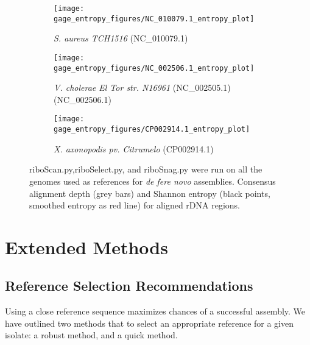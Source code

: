 \documentclass[10pt]{article}
\begin{document}
\begin{figure}
  \centering
  \ContinuedFloat
  \begin{subfigure}[b]{.45\textwidth}
    \texttt{[image: gage\_entropy\_figures/NC\_010079.1\_entropy\_plot]}
    \caption{\textit{S. aureus TCH1516} (NC\_010079.1)}
    \label{fig:ent_tch}
  \end{subfigure}
  \begin{subfigure}[b]{.45\textwidth}
    \texttt{[image: gage\_entropy\_figures/NC\_002506.1\_entropy\_plot]}
    \caption{\textit{V. cholerae El Tor str. N16961} (NC\_002505.1) (NC\_002506.1)}
    \label{fig:ent_vib}
  \end{subfigure}
  \begin{subfigure}[b]{.45\textwidth}
    \texttt{[image: gage\_entropy\_figures/CP002914.1\_entropy\_plot]}
    \caption{\textit{X. axonopodis pv. Citrumelo} (CP002914.1)}
  \end{subfigure}
  \caption{riboScan.py,riboSelect.py, and riboSnag.py were run on all the genomes used as references for \textit{de fere novo} assemblies. Consensus alignment depth (grey bars) and Shannon entropy (black points, smoothed entropy as red line) for aligned rDNA regions.}
  \label{fig:ent_gage}

\end{figure}

\pagebreak


\section*{Extended Methods}

\subsection*{Reference Selection Recommendations}
Using a close reference sequence maximizes chances of a successful assembly. We have outlined two methods that to select an appropriate reference for a given isolate: a robust method, and a quick method.
\end{document}
